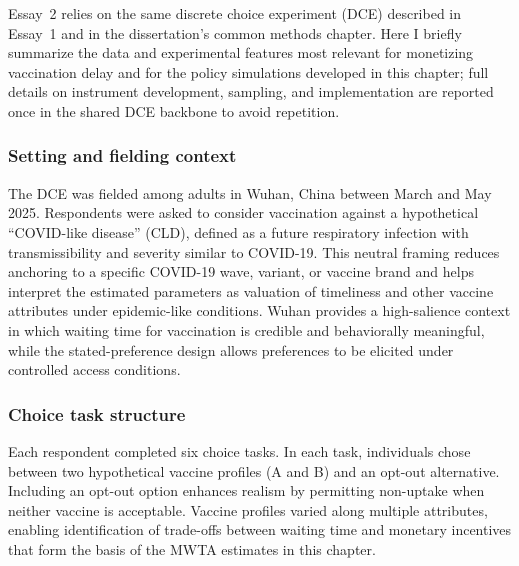 \documentclass[doublespacing]{utdthesis}
\begin{document}
Essay~2 relies on the same discrete choice experiment (DCE) described in Essay~1 and in the dissertation’s common methods chapter. Here I briefly summarize the data and experimental features most relevant for monetizing vaccination delay and for the policy simulations developed in this chapter; full details on instrument development, sampling, and implementation are reported once in the shared DCE backbone to avoid repetition.

\subsubsection{Setting and fielding context}
The DCE was fielded among adults in Wuhan, China between March and May 2025. Respondents were asked to consider vaccination against a hypothetical ``COVID-like disease'' (CLD), defined as a future respiratory infection with transmissibility and severity similar to COVID-19. This neutral framing reduces anchoring to a specific COVID-19 wave, variant, or vaccine brand and helps interpret the estimated parameters as valuation of timeliness and other vaccine attributes under epidemic-like conditions. Wuhan provides a high-salience context in which waiting time for vaccination is credible and behaviorally meaningful, while the stated-preference design allows preferences to be elicited under controlled access conditions.

\subsubsection{Choice task structure}
Each respondent completed six choice tasks. In each task, individuals chose between two hypothetical vaccine profiles (A and B) and an opt-out alternative. Including an opt-out option enhances realism by permitting non-uptake when neither vaccine is acceptable. Vaccine profiles varied along multiple attributes, enabling identification of trade-offs between waiting time and monetary incentives that form the basis of the MWTA estimates in this chapter.
\end{document}
